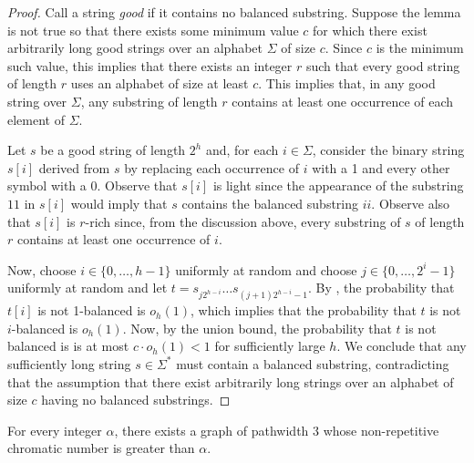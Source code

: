 \documentclass{patmorin}
\begin{document}
\begin{proof}
  Call a string \emph{good} if it contains no balanced substring.
  Suppose the lemma is not true so that there exists some minimum value
  $c$ for which there exist arbitrarily long good strings over an alphabet
  $\Sigma$ of size $c$.  
  Since $c$ is the minimum such value, this implies that there exists an
  integer $r$ such that every good string of length $r$ uses an alphabet
  of size at least $c$.  This implies that, in any good string over
  $\Sigma$, any substring of length $r$ contains at least one occurrence
  of each element of $\Sigma$.

  Let $s$ be a good string of length $2^h$ and, for each $i\in\Sigma$,
  consider the binary string $s[i]$ derived from $s$ by replacing
  each occurrence of $i$ with a 1 and every other symbol with a 0.
  Observe that $s[i]$ is light since the appearance of the substring $11$
  in $s[i]$ would imply that $s$ contains the balanced substring $ii$.
  Observe also that $s[i]$ is $r$-rich since, from the discussion above,
  every substring of $s$ of length $r$ contains at least one occurrence
  of $i$.

  Now, choose $i\in\{0,\ldots,h-1\}$ uniformly at random and
  choose $j\in\{0,\ldots,2^{i}-1\}$ uniformly at random and let
  $t=s_{j2^{h-i}}\ldots s_{(j+1)2^{h-i}-1}$.  By , the
  probability that $t[i]$ is not 1-balanced is $o_h(1)$, which implies
  that the probability that $t$ is not $i$-balanced is $o_h(1)$.  Now,
  by the union bound, the probability that $t$ is not balanced is is
  at most $c\cdot o_h(1) < 1$ for sufficiently large $h$. We conclude
  that any sufficiently long string $s\in \Sigma^*$ must contain a
  balanced substring, contradicting that the assumption that there
  exist arbitrarily long strings over an alphabet of size $c$ having no
  balanced substrings.
\end{proof}


\begin{thm}
  For every integer $\alpha$, there exists a graph of pathwidth 3 whose
  non-repetitive chromatic number is greater than $\alpha$.
\end{thm}
\end{document}
